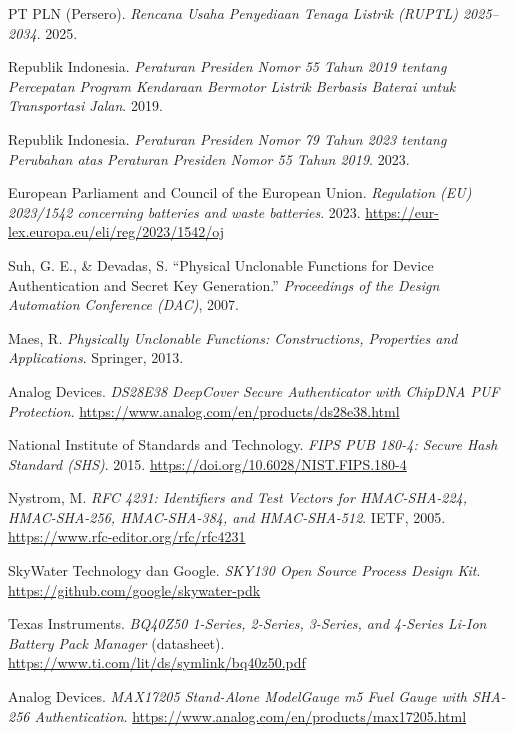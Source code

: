 \documentclass[11pt,a4paper]{article}
\begin{document}
\begin{enumerate}[label={[\arabic*]},ref={\arabic*}]
  \item\label{ref:ruptl} PT PLN (Persero). \textit{Rencana Usaha Penyediaan Tenaga Listrik (RUPTL) 2025--2034}. 2025.
  \item Republik Indonesia. \textit{Peraturan Presiden Nomor 55 Tahun 2019 tentang Percepatan Program Kendaraan Bermotor Listrik Berbasis Baterai untuk Transportasi Jalan}. 2019.
  \item Republik Indonesia. \textit{Peraturan Presiden Nomor 79 Tahun 2023 tentang Perubahan atas Peraturan Presiden Nomor 55 Tahun 2019}. 2023.
  \item European Parliament and Council of the European Union. \textit{Regulation (EU) 2023/1542 concerning batteries and waste batteries}. 2023. \url{https://eur-lex.europa.eu/eli/reg/2023/1542/oj}
  \item\label{ref:suh} Suh, G. E., \& Devadas, S. ``Physical Unclonable Functions for Device Authentication and Secret Key Generation.'' \textit{Proceedings of the Design Automation Conference (DAC)}, 2007.
  \item\label{ref:maes} Maes, R. \textit{Physically Unclonable Functions: Constructions, Properties and Applications}. Springer, 2013.
  \item\label{ref:ds28e38} Analog Devices. \textit{DS28E38 DeepCover Secure Authenticator with ChipDNA PUF Protection}. \url{https://www.analog.com/en/products/ds28e38.html}
  \item\label{ref:fips} National Institute of Standards and Technology. \textit{FIPS PUB 180-4: Secure Hash Standard (SHS)}. 2015. \url{https://doi.org/10.6028/NIST.FIPS.180-4}
  \item\label{ref:rfc} Nystrom, M. \textit{RFC 4231: Identifiers and Test Vectors for HMAC-SHA-224, HMAC-SHA-256, HMAC-SHA-384, and HMAC-SHA-512}. IETF, 2005. \url{https://www.rfc-editor.org/rfc/rfc4231}
  \item\label{ref:sky130} SkyWater Technology dan Google. \textit{SKY130 Open Source Process Design Kit}. \url{https://github.com/google/skywater-pdk}
  \item\label{ref:bq40z50} Texas Instruments. \textit{BQ40Z50 1-Series, 2-Series, 3-Series, and 4-Series Li-Ion Battery Pack Manager} (datasheet). \url{https://www.ti.com/lit/ds/symlink/bq40z50.pdf}
  \item\label{ref:max17205} Analog Devices. \textit{MAX17205 Stand-Alone ModelGauge m5 Fuel Gauge with SHA-256 Authentication}. \url{https://www.analog.com/en/products/max17205.html}

\end{enumerate}
\end{document}

